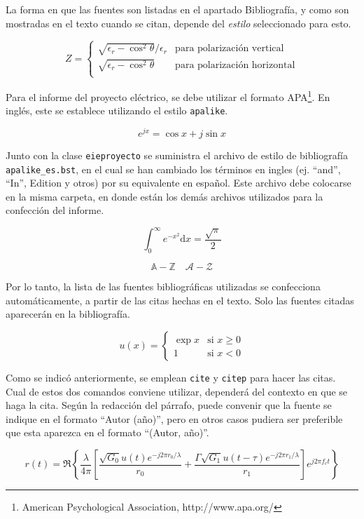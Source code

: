 La forma en que las fuentes son listadas en el apartado Bibliografía, y como son mostradas en el texto cuando se citan, depende del \emph{estilo} seleccionado para esto.

\begin{equation}
Z = \begin{cases}
\sqrt{\epsilon_r - \cos^2 \theta}/\epsilon_r & \text{para polarización vertical} \\
\sqrt{\epsilon_r - \cos^2 \theta} & \text{para polarización horizontal} \\
\end{cases}
\end{equation}

Para el informe del proyecto eléctrico, se debe utilizar el formato APA\footnote{American Psychological Association, http://www.apa.org/}.  En inglés, este se establece utilizando el estilo \texttt{apalike}.

\begin{equation}
 e^{jx} = \cos{x} + j \sin{x}
\end{equation}

Junto con la clase \texttt{eieproyecto} se suministra el archivo de estilo de bibliografía \texttt{apalike\_es.bst}, en el cual se han cambiado los términos en ingles (ej. ``and'', ``In'', Edition y otros) por su equivalente en español.  Este archivo debe colocarse en la misma carpeta, en donde están los demás archivos utilizados para la confección del informe.

\begin{equation}
\int_0^\infty e^{-x^2} \mathrm{d}x = \frac{\sqrt{\pi}}{2}
\end{equation}

\begin{equation}
\mathbb{A-Z} \quad
\mathcal{A-Z}
\end{equation}

Por lo tanto, la lista de las fuentes bibliográficas utilizadas se confecciona automáticamente, a partir de las citas hechas en el texto.  Solo las fuentes citadas aparecerán en la bibliografía.

\begin{equation}
u(x) =
  \begin{cases}
   \exp{x} & \text{si } x \geq 0 \\
   1       & \text{si } x < 0
  \end{cases}
\end{equation}

Como se indicó anteriormente, se emplean \texttt{cite} y \texttt{citep} para hacer las citas.  Cual de estos dos comandos conviene utilizar, dependerá del contexto en que se haga la cita.  Según la redacción del párrafo, puede convenir que la fuente se indique en el formato ``Autor (año)'', pero en otros casos pudiera ser preferible que esta aparezca en el formato ``(Autor, año)''.

\begin{equation}
r(t) = \Re \left\lbrace \frac{\lambda}{4\pi} \left[ \frac{\sqrt{G_0} u(t) e^{-j2\pi r_0/\lambda}}{r_0} + \frac{\Gamma \sqrt{G_1} u(t-\tau) e^{-j2\pi r_1/\lambda}}{r_1} \right] e^{j2\pi f_c t}  \right\rbrace
\end{equation}
